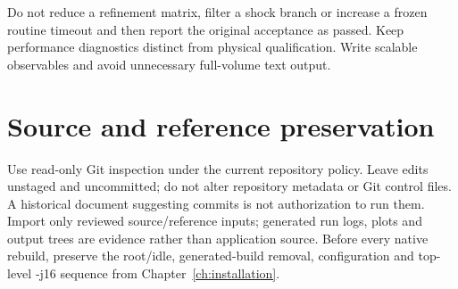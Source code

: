 Do not reduce a refinement matrix, filter a shock branch or increase a frozen
routine timeout and then report the original acceptance as passed.
Keep performance diagnostics distinct from physical qualification.
Write scalable observables and avoid unnecessary full-volume text output.

\section{Source and reference preservation}
Use read-only Git inspection under the current repository policy. Leave edits
unstaged and uncommitted; do not alter repository metadata or Git control
files. A historical document suggesting commits is not authorization to run
them. Import only reviewed source/reference inputs; generated run logs,
plots and output trees are evidence rather than application source.
Before every native rebuild, preserve the root/idle, generated-build removal,
configuration and top-level -j16 sequence from Chapter~\ref{ch:installation}.
